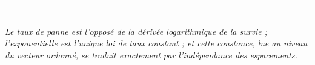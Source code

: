 \documentclass[11pt,a4paper]{article}
\theoremstyle{plain}
\theoremstyle{definition}
\theoremstyle{remark}
\begin{document}
\vspace{1.2em}
\begin{center}
\rule{0.35\textwidth}{0.4pt}\\[0.5em]
\textit{Le taux de panne est l'opposé de la dérivée logarithmique de la survie ;
l'exponentielle est l'unique loi de taux constant ; et cette constance, lue au
niveau du vecteur ordonné, se traduit exactement par l'indépendance des
espacements.}
\end{center}
\end{document}
